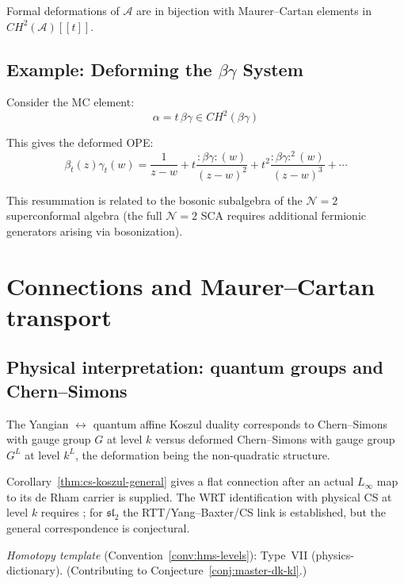 \begin{theorem}
\label{thm:deformations-maurer-cartan}
Formal deformations of $\mathcal{A}$ are in bijection with Maurer--Cartan elements in $CH^2(\mathcal{A})[[t]]$.
\end{theorem}

\subsection{\texorpdfstring{Example: Deforming the $\beta\gamma$ System}{Example: Deforming the System}}

Consider the MC element:
\[
\alpha = t \, \beta \gamma \in CH^2(\beta\gamma)
\]

This gives the deformed OPE:
\[
\beta_t(z)\gamma_t(w) = \frac{1}{z-w} + t \frac{:\beta\gamma:(w)}{(z-w)^2} + t^2 \frac{:\beta\gamma:^2(w)}{(z-w)^3} + \cdots
\]

This resummation is related to the bosonic subalgebra of the $\mathcal{N}=2$ superconformal algebra (the full $\mathcal{N}=2$ SCA requires additional fermionic generators arising via bosonization).


\section{Connections and Maurer--Cartan transport}



\subsection{Physical interpretation: quantum groups and Chern--Simons}

\begin{conjecture}\label{conj:wrt-conjecture}
The Yangian $\leftrightarrow$ quantum affine Koszul duality corresponds to Chern--Simons with gauge group $G$ at level $k$ versus deformed Chern--Simons with gauge group $G^L$ at level $k^L$, the deformation being the non-quadratic structure.
\end{conjecture}

\begin{remark}[Scope]
Corollary~\ref{thm:cs-koszul-general} gives a flat connection after an actual $L_\infty$ map to its de Rham carrier is supplied.  The WRT identification with physical CS at level $k$ requires \cite{Wit89,RT91}; for $\mathfrak{sl}_2$ the RTT/Yang--Baxter/CS link is established, but the general correspondence is conjectural.

\emph{Homotopy template} (Convention~\ref{conv:hms-levels}): Type~VII (physics-dictionary).  (Contributing to Conjecture~\ref{conj:master-dk-kl}.)
\end{remark}

